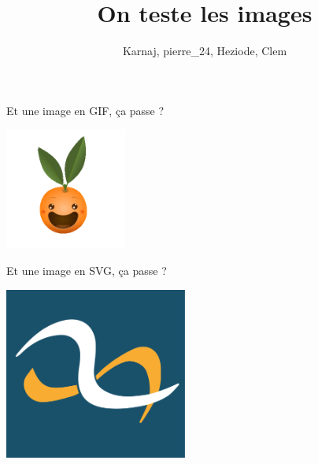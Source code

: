 \documentclass[small]{zmdocument}
\title{On teste les images}
\author{Karnaj, pierre\_24, Heziode, Clem}
\begin{document}
\maketitle
\toc

\levelOneIntroduction


Et une image en GIF, ça passe ?

\begin{center}
\includegraphics[width=4cm]{test-images/image_in_gif.gif}
\end{center}

Et une image en SVG, ça passe ?

\begin{center}
\includegraphics[width=6cm]{test-images/image_in_svg.svg}
\end{center}
\end{document}
